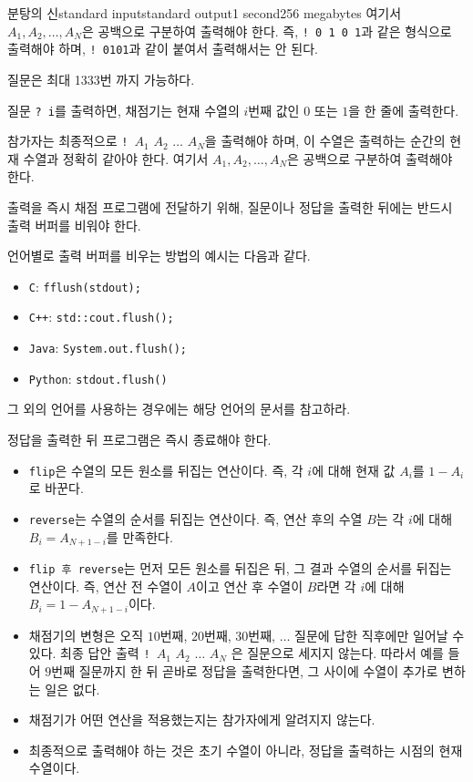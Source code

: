 \begin{problem}{분탕의 신}{standard input}{standard output}{1 second}{256 megabytes}
여기서 $A_1, A_2, \dots, A_N$은 공백으로 구분하여 출력해야 한다.
즉, \texttt{! 0 1 0 1}과 같은 형식으로 출력해야 하며, \texttt{! 0101}과 같이 붙여서 출력해서는 안 된다.

질문은 최대 1333번 까지 가능하다.

\Interaction
질문 \texttt{? i}를 출력하면, 채점기는 현재 수열의 $i$번째 값인 $0$ 또는 $1$을 한 줄에 출력한다.

참가자는 최종적으로 \texttt{! }$A_1$ $A_2$ $\dots$ $A_N$을 출력해야 하며, 이 수열은 출력하는 순간의 현재 수열과 정확히 같아야 한다.
여기서 $A_1, A_2, \dots, A_N$은 공백으로 구분하여 출력해야 한다.

출력을 즉시 채점 프로그램에 전달하기 위해, 질문이나 정답을 출력한 뒤에는 반드시 출력 버퍼를 비워야 한다.

언어별로 출력 버퍼를 비우는 방법의 예시는 다음과 같다.

\begin{itemize}
    \item \texttt{C}: \texttt{fflush(stdout);}
    \item \texttt{C++}: \texttt{std::cout.flush();}
    \item \texttt{Java}: \texttt{System.out.flush();}
    \item \texttt{Python}: \texttt{stdout.flush()}
\end{itemize}

그 외의 언어를 사용하는 경우에는 해당 언어의 문서를 참고하라.

정답을 출력한 뒤 프로그램은 즉시 종료해야 한다.

\Example

\begin{example}
%
\end{example}

\Note
\begin{itemize}
    \item \texttt{flip}은 수열의 모든 원소를 뒤집는 연산이다. 즉, 각 $i$에 대해 현재 값 $A_i$를 $1-A_i$로 바꾼다.
    \item \texttt{reverse}는 수열의 순서를 뒤집는 연산이다. 즉, 연산 후의 수열 $B$는 각 $i$에 대해 $B_i = A_{N+1-i}$를 만족한다.
    \item \texttt{flip 후 reverse}는 먼저 모든 원소를 뒤집은 뒤, 그 결과 수열의 순서를 뒤집는 연산이다. 즉, 연산 전 수열이 $A$이고 연산 후 수열이 $B$라면 각 $i$에 대해 $B_i = 1 - A_{N+1-i}$이다.
    \item 채점기의 변형은 오직 $10$번째, $20$번째, $30$번째, $\dots$ 질문에 답한 직후에만 일어날 수 있다. 최종 답안 출력 \texttt{! }$A_1$ $A_2$ $\dots$ $A_N$ 은 질문으로 세지지 않는다. 따라서 예를 들어 $9$번째 질문까지 한 뒤 곧바로 정답을 출력한다면, 그 사이에 수열이 추가로 변하는 일은 없다.
    \item 채점기가 어떤 연산을 적용했는지는 참가자에게 알려지지 않는다.
    \item 최종적으로 출력해야 하는 것은 초기 수열이 아니라, 정답을 출력하는 시점의 현재 수열이다.
\end{itemize}

\end{problem}

